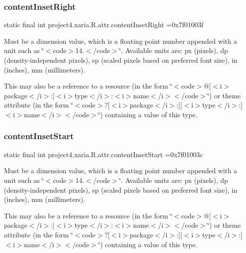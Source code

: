 \subsubsection{\texorpdfstring{content\+Inset\+Right}{contentInsetRight}}
{\footnotesize\ttfamily static final int project4.\+xaria.\+R.\+attr.\+content\+Inset\+Right =0x7f01003f\hspace{0.3cm}{\ttfamily [static]}}

Must be a dimension value, which is a floating point number appended with a unit such as \char`\"{}$<$code$>$14.\+5sp$<$/code$>$\char`\"{}. Available units are\+: px (pixels), dp (density-\/independent pixels), sp (scaled pixels based on preferred font size), in (inches), mm (millimeters). 

This may also be a reference to a resource (in the form \char`\"{}$<$code$>$@\mbox{[}$<$i$>$package$<$/i$>$\+:\mbox{]}$<$i$>$type$<$/i$>$\+:$<$i$>$name$<$/i$>$$<$/code$>$\char`\"{}) or theme attribute (in the form \char`\"{}$<$code$>$?\mbox{[}$<$i$>$package$<$/i$>$\+:\mbox{]}\mbox{[}$<$i$>$type$<$/i$>$\+:\mbox{]}$<$i$>$name$<$/i$>$$<$/code$>$\char`\"{}) containing a value of this type. \mbox{\label{classproject4_1_1xaria_1_1R_1_1attr_af473293c9191579b7049ad932142e6ce}} 
\subsubsection{\texorpdfstring{content\+Inset\+Start}{contentInsetStart}}
{\footnotesize\ttfamily static final int project4.\+xaria.\+R.\+attr.\+content\+Inset\+Start =0x7f01003c\hspace{0.3cm}{\ttfamily [static]}}

Must be a dimension value, which is a floating point number appended with a unit such as \char`\"{}$<$code$>$14.\+5sp$<$/code$>$\char`\"{}. Available units are\+: px (pixels), dp (density-\/independent pixels), sp (scaled pixels based on preferred font size), in (inches), mm (millimeters). 

This may also be a reference to a resource (in the form \char`\"{}$<$code$>$@\mbox{[}$<$i$>$package$<$/i$>$\+:\mbox{]}$<$i$>$type$<$/i$>$\+:$<$i$>$name$<$/i$>$$<$/code$>$\char`\"{}) or theme attribute (in the form \char`\"{}$<$code$>$?\mbox{[}$<$i$>$package$<$/i$>$\+:\mbox{]}\mbox{[}$<$i$>$type$<$/i$>$\+:\mbox{]}$<$i$>$name$<$/i$>$$<$/code$>$\char`\"{}) containing a value of this type. \mbox{\label{classproject4_1_1xaria_1_1R_1_1attr_a565210383011ea51dc77cee55f23eb54}} 
